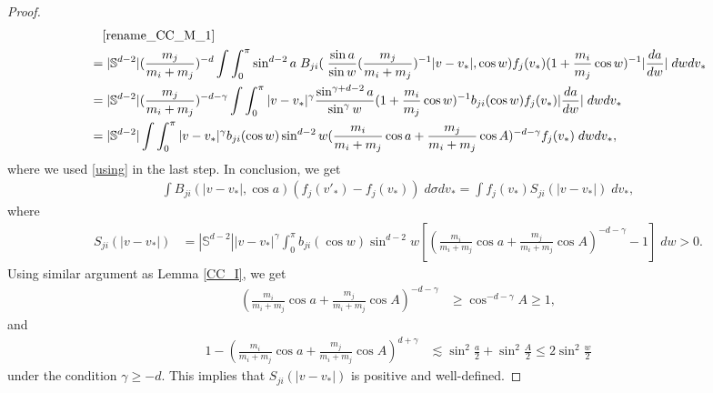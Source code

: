 \documentclass[reqno,10pt]{amsart}
\numberwithin{equation}{section}
\begin{document}
\begin{proof}
\begin{align}
    &\quad \eqref{rename_CC_M_1} \notag \\
    &=|\mathbb{S}^{d-2}|(\frac{m_j}{m_i+m_j})^{-d}\int \int_0^\pi \sin^{d-2}a \; B_{ji}(\;\frac{\sin a}{\sin w}(\frac{m_j}{m_i+m_j})^{-1}|v-v_*|,\cos w)
    f_j(v_*)(1+\frac{m_i}{m_j}\cos w)^{-1}|\frac{da}{dw}|\; dwdv_*  \notag \\
    &= |\mathbb{S}^{d-2}|(\frac{m_j}{m_i+m_j})^{-d-\gamma}\int \int_0^\pi |v-v_*|^{\gamma} \frac{\sin^{\gamma+d-2}a}{\sin^{\gamma}w}(1+\frac{m_i}{m_j}\cos w)^{-1}b_{ji}(\cos w) f_j(v_*)|\frac{da}{dw}| \; dwdv_* \notag\\ 
     &=|\mathbb{S}^{d-2}|\int \int_0^\pi |v-v_*|^{\gamma}b_{ji}(\cos w)\sin^{d-2}w (\frac{m_i}{m_i+m_j}\cos a + \frac{m_j}{m_i+m_j}\cos A)^{-d-\gamma}f_j(v_*) \; dwdv_*, \notag
\end{align} 
where we used \eqref{using} in the last step. In conclusion, we get 
\begin{align*}
    \int B_{ji}(|v-v_*|, \cos a)(f_j(v'_*)-f_j(v_*)) \; d\sigma dv_*
    = \int f_j(v_*)S_{ji}(|v-v_*|) \; dv_*,
\end{align*}
where 
\begin{align*}
    S_{ji}(|v-v_*|)
    &= |\mathbb{S}^{d-2}||v-v_*|^{\gamma}\int_0^\pi b_{ji}(\cos w)\sin^{d-2}w [(\frac{m_i}{m_i+m_j}\cos a + \frac{m_j}{m_i+m_j}\cos A)^{-d-\gamma}-1] \; dw > 0.
\end{align*}
Using similar argument as Lemma \ref{CC_I}, we get
\begin{align*}
    (\frac{m_i}{m_i+m_j}\cos a + \frac{m_j}{m_i+m_j}\cos A)^{-d-\gamma}  &\geq \cos^{-d-\gamma}A \geq 1,
\end{align*}
and
\begin{align*}
     1-(\frac{m_i}{m_i+m_j}\cos a + \frac{m_j}{m_i+m_j}\cos A)^{d+\gamma}
     &\lesssim \sin^{2}\frac{a}{2}+\sin^{2}\frac{A}{2}
 \leq 2\sin^{2}\frac{w}{2}
\end{align*} under the condition $\gamma \geq -d.$ This implies that $S_{ji}(|v-v_*|)$ is positive and well-defined.
\end{proof} \vspace{3mm}
\end{document}
